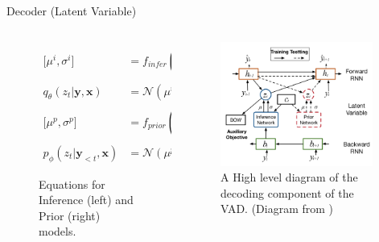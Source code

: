 \documentclass[aspectratio=169, 11pt]{beamer}
\begin{document}
\begin{frame}{Decoder (Latent Variable)}
  \begin{columns}
    \begin{column}{0.5\textwidth}
      \begin{figure}[!ht]
        \begin{equation}
          \begin{split}
            \lbrack \mu^i, \sigma^i \rbrack &=
            f_{infer}([\overrightarrow{h^d_{t-1}}, c_t, \overleftarrow{h^d_t}])
            \\
            q_{\theta}(z_t|\boldsymbol{y}, \boldsymbol{x}) &= \mathcal{N}(\mu^i, \sigma^i) \\
            \lbrack \mu^p, \sigma^p \rbrack &=
            f_{prior}([\overrightarrow{h^d_{t-1}}, c_t])
            \\
            p_{\phi}(z_t|\boldsymbol{y}_{<t}, \boldsymbol{x}) &= \mathcal{N}(\mu^p, \sigma^p)
          \end{split}
        \end{equation}
        \caption{Equations for Inference (left) and Prior (right) models.}
        \label{inf_prior}
        \end{figure}    
    \end{column}
    \begin{column}{0.5\textwidth}  %
      \begin{figure}[!ht]
        \centering
        \includegraphics[width=50mm]{diagrams/vad_decoder.png}
        \caption{A High level diagram of the decoding component of the VAD. (Diagram from \cite{du_variational_2018})\label{r:vad_decoder}}
        \end{figure}
    \end{column}
    \end{columns}
  \end{frame}
 
\end{document}
